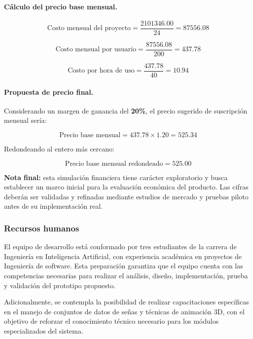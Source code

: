 \paragraph{\textbf{Cálculo del precio base mensual.}}

\[
\text{Costo mensual del proyecto} = \frac{\num{2101346.00}}{24} = \num{87556.08}
\]

\[
\text{Costo mensual por usuario} = \frac{\num{87556.08}}{200} = \num{437.78}
\]

\[
\text{Costo por hora de uso} = \frac{\num{437.78}}{40} = \num{10.94}
\]

\paragraph{\textbf{Propuesta de precio final.}}
Considerando un margen de ganancia del \textbf{20\%}, el precio sugerido de suscripción mensual sería:

\[
\text{Precio base mensual} = \num{437.78} \times 1.20 = \num{525.34}
\]

Redondeando al entero más cercano:

\[
\text{Precio base mensual redondeado} = \num{525.00}
\]

\begin{flushleft}
	\textbf{Nota final:} esta simulación financiera tiene carácter exploratorio y busca establecer un marco inicial para la evaluación económica del producto. Las cifras deberán ser validadas y refinadas mediante estudios de mercado y pruebas piloto antes de su implementación real.
\end{flushleft}



\subsubsection{Recursos humanos}
El equipo de desarrollo está conformado por tres estudiantes de la carrera de Ingeniería en Inteligencia Artificial, con experiencia académica en proyectos de Ingeniería de software. Esta preparación garantiza que el equipo cuenta con las competencias necesarias para realizar el análisis, diseño, implementación, prueba y validación del prototipo propuesto.

Adicionalmente, se contempla la posibilidad de realizar capacitaciones específicas en el manejo de conjuntos de datos de señas y técnicas de animación 3D, con el objetivo de reforzar el conocimiento técnico necesario para los módulos especializados del sistema.

